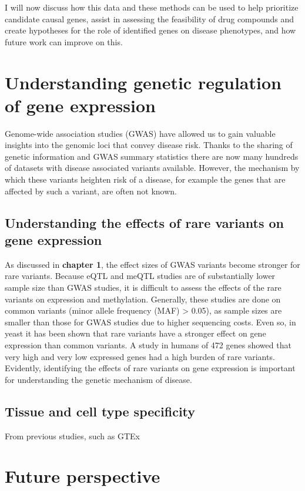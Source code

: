 I will now discuss how this data and these methods can be used to help prioritize candidate causal genes, assist in assessing the feasibility of drug compounds and create hypotheses for the role of identified genes on disease phenotypes, and how future work can improve on this.

\section{Understanding genetic regulation of gene expression}
Genome-wide association studies (GWAS) have allowed us to gain valuable insights into the genomic loci that convey disease risk.  Thanks to the sharing of genetic information and GWAS summary statistics there are now many hundreds of datasets with disease associated variants available\cite{visscher10YearsGWAS2017}. However, the mechanism by which these variants heighten risk of a disease, for example the genes that are affected by such a variant, are often not known. 

\subsection{Understanding the effects of rare variants on gene expression}
As discussed in \textbf{chapter 1}, the effect sizes of GWAS variants become stronger for rare variants. Because eQTL and meQTL studies are of substantially lower sample size than GWAS studies, it is difficult to assess the effects of the rare variants on expression and methylation. Generally, these studies are done on common variants (minor allele frequency (MAF) > 0.05), as sample sizes are smaller than those for GWAS studies due to higher sequencing costs. Even so, in yeast it has been shown that rare variants have a stronger effect on gene expression than common variants\cite{bloomRareVariantsContribute2019}. A study in humans of 472 genes showed that very high and very low expressed genes had a high burden of rare variants\cite{zhaoBurdenRareVariants2016}. Evidently, identifying the effects of rare variants on gene expression is important for understanding the genetic mechanism of disease. 

\subsection{Tissue and cell type specificity}
From previous studies, such as GTEx\cite{lonsdaleGenotypeTissueExpressionGTEx2013}

\section{Future perspective}


